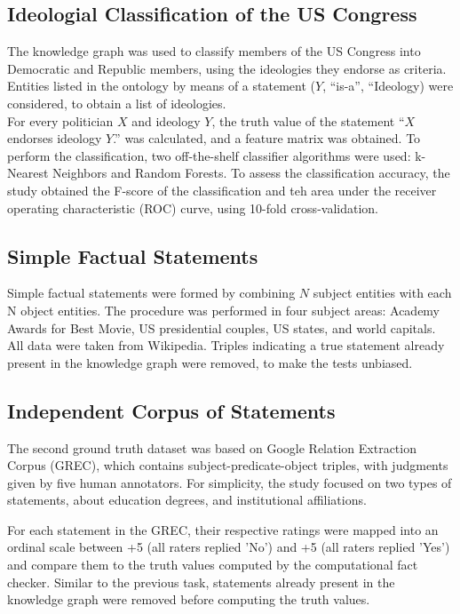 \documentclass[10pt,11pt,12pt,oneside]{book}
\begin{document}
	\subsection{Ideologial Classification of the US Congress}
	
	The knowledge graph was used to classify members of the US Congress into Democratic and Republic members, using the ideologies they endorse as criteria. Entities listed in the ontology by means of a statement ($Y$, “is-a”, “Ideology) were considered, to obtain a list of ideologies.\\
	
	For every politician $X$ and ideology $Y$, the truth value of the statement “$X$ endorses ideology $Y$.” was calculated, and a feature matrix was obtained. To perform the classification, two off-the-shelf classifier algorithms were used: k-Nearest Neighbors and Random Forests. To assess the classification accuracy, the study obtained the F-score of the classification and teh area under the receiver operating characteristic (ROC) curve, using 10-fold cross-validation.\\
	
	\subsection{Simple Factual Statements}
	Simple factual statements were formed by combining $N$ subject entities with each N object entities. The procedure was performed in four subject areas: Academy Awards for Best Movie, US presidential couples, US states, and world capitals. All data were taken from Wikipedia. Triples indicating a true statement  already present in the knowledge graph were removed, to make the tests unbiased.
	
	\subsection{Independent Corpus of Statements}
	The second ground truth dataset was based on Google Relation Extraction Corpus (GREC), which contains subject-predicate-object triples, with judgments given by five human annotators. For simplicity, the study focused on two types of statements, about education degrees, and institutional affiliations. 
	
	For each statement in the GREC, their respective ratings were mapped into an ordinal scale between +5 (all raters replied 'No') and +5 (all raters replied 'Yes') and compare them to the truth values computed by the computational fact checker. Similar to the previous task, statements already present in the knowledge graph were removed before computing the truth values.
	
\end{document}
